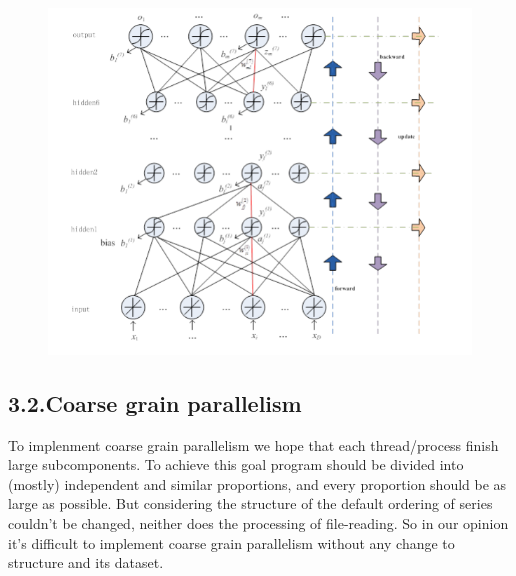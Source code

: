 \documentclass{article}
\begin{document}
\begin{figure}[tbp]%
\begin{mdcenter}%

\noindent{}\includegraphics[keepaspectratio=true,width=\dimmin{}{\dimwidth{0.90}}]{images/2016-02-21-21-15-24-}{}%

\mdhr{}%

\noindent{}%
\end{mdcenter}\label{fig-figure}%
\end{figure}%

\subsection{3.2.\hspace*{0.5em}Coarse grain parallelism}\label{sec-coarse-grain-parallelism}%

\noindent{}To implenment coarse grain parallelism we hope that each thread/process finish large subcomponents. To achieve this goal  program should be divided into (mostly) independent and similar proportions, and every proportion should be as large as possible. But considering the structure of  the default ordering of  series couldn't be changed, neither does the processing of file-reading. So in our opinion it's difficult to implement coarse grain parallelism without any change to  structure and its dataset.%
\end{document}
